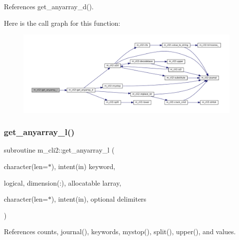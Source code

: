 References get\+\_\+anyarray\+\_\+d().

Here is the call graph for this function\+:
\nopagebreak
\begin{figure}[H]
\begin{center}
\leavevmode
\includegraphics[width=350pt]{namespacem__cli2_ad314315dd5c93abff5168265f5ff0e4e_cgraph}
\end{center}
\end{figure}
\mbox{\label{namespacem__cli2_a47cc758d20b655bc21672c31289e54ce}} 
\subsubsection{\texorpdfstring{get\+\_\+anyarray\+\_\+l()}{get\_anyarray\_l()}}
{\footnotesize\ttfamily subroutine m\+\_\+cli2\+::get\+\_\+anyarray\+\_\+l (\begin{DoxyParamCaption}\item[{character(len=$\ast$), intent(in)}]{keyword,  }\item[{logical, dimension(\+:), allocatable}]{larray,  }\item[{character(len=$\ast$), intent(in), optional}]{delimiters }\end{DoxyParamCaption})\hspace{0.3cm}{\ttfamily [private]}}



References counts, journal(), keywords, mystop(), split(), upper(), and values.

